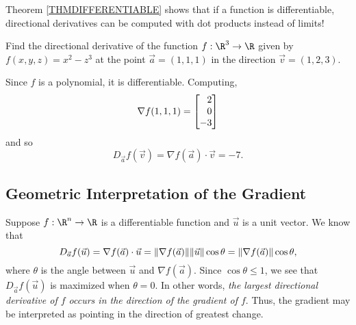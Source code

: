 Theorem \ref{THMDIFFERENTIABLE} shows that if a function is differentiable,
directional derivatives can be computed with dot products instead of limits!

\begin{example}
	Find the directional derivative of the function $f:\R^3\to\R$
	given by $f(x,y,z)=x^2-z^3$ at the point $\vec a=(1,1,1)$ in the direction
	$\vec v=(1,2,3)$.

	Since $f$ is a polynomial, it is differentiable.  Computing,
	\[
		\nabla f(1,1,1) = \mat{2\\0\\-3}
	\]
	and so
	\[
		D_{\vec a}f(\vec v) = \nabla f(\vec a)\cdot \vec v=-7.
	\]
\end{example}

\subsection{Geometric Interpretation of the Gradient}

Suppose $f:\R^n\to \R$ is a differentiable function and $\vec u$ is
a unit vector.  We know that
\[
	D_{\vec a}f(\vec u) = \nabla f(\vec a)\cdot \vec u = 
	\lVert\nabla f(\vec a)\rVert\lVert\vec u\rVert\cos\theta=\lVert\nabla f(\vec a)\rVert\cos\theta,
\]
where $\theta$ is the angle between $\vec u$ and $\nabla f(\vec a)$.
Since $\cos \theta \leq 1$,
we see that $D_{\vec a}f(\vec u)$ is maximized when $\theta=0$.  In other words,
\emph{the largest directional derivative 
of $f$ occurs in the direction of the gradient of $f$}.  Thus, the gradient may be interpreted
as pointing in the direction of greatest change.

\begin{center}
\end{center}

